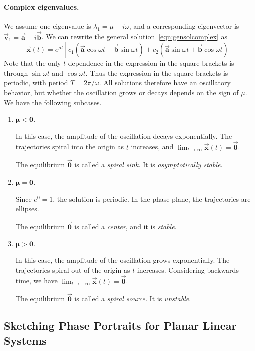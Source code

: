 \documentclass[reqno]{immbook}
\newcommand{\BA}{\vec{\textbf{a}}}
\newcommand{\BB}{\vec{\textbf{b}}}
\newcommand{\BV}{\vec{\textbf{v}}}
\newcommand{\BX}{\vec{\textbf{x}}}
\newcommand{\BZ}{\vec{\textbf{0}}}  %
\newcommand{\ds}{\displaystyle}
\begin{document}
\paragraph{Complex eigenvalues.}
We assume one eigenvalue is $\lambda_1 = \mu + i\omega$,
and a corresponding eigenvector is
$\BV_1 = \BA+i\BB$.
We can rewrite the general solution~\eqref{eqn:gensolcomplex}
as
\begin{equation}
\BX(t) = 
     e^{\mu t} \left[ c_1 \left(\BA\cos\omega t - \BB\sin\omega t \right)
         + c_2 \left(\BA\sin\omega t + \BB\cos\omega t\right)\right]
\end{equation}
Note that the only $t$ dependence in the expression in the square
brackets is through $\sin\omega t$ and $\cos\omega t$.
Thus the expression in the square brackets is periodic, with
period $T = 2\pi/\omega$.
All solutions therefore have an oscillatory behavior, 
but whether the oscillation grows or decays depends on the
sign of $\mu$.
We have the following subcases.
\begin{enumerate}

\item $\pmb{\mu < 0}$.

In this case, the amplitude of the oscillation decays
exponentially.
The trajectories spiral into the origin as $t$ increases,
and $\ds\lim_{t\rightarrow\infty} \BX(t) = \BZ$.

The equilibrium $\BZ$ is called a \emph{spiral sink.}
It is \emph{asymptotically stable}.

\item $\pmb{\mu = 0}$.

Since $e^{0}=1$, the solution is periodic.
In the phase plane, the trajectories are ellipses.

The equilibrium $\BZ$ is called a \emph{center}, and it is
\emph{stable}.

\item $\pmb{\mu > 0}$.

In this case, the amplitude of the oscillation grows
exponentially.
The trajectories spiral out of the origin as $t$ increases.
Considering backwards time, we have
$\ds \lim_{t\rightarrow-\infty} \BX(t) = \BZ$.

The equilibrium $\BZ$ is called a \emph{spiral source.}
It is \emph{unstable}.
\end{enumerate}

\subsection*{Sketching Phase Portraits for Planar Linear Systems}
\end{document}
